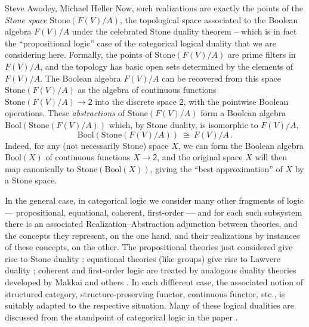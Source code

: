 \begin{artengenv2auth}{Steve Awodey, Michael Heller}
Now, such realizations are exactly the points of the \emph{Stone space} $\mathrm{Stone}(F(V)/A)$, the topological space associated to the Boolean algebra $F(V)/A$ under the celebrated Stone duality theorem \parencite{Johnstone} -- which is in fact the ``propositional logic'' case of the categorical logical duality that we are considering here.  Formally, the points of $\mathrm{Stone}(F(V)/A)$ are prime filters in $F(V)/A$, and the topology has basic open sets determined by the elements of $F(V)/A$.  The Boolean algebra $F(V)/A$ can be recovered from this space $\mathrm{Stone}(F(V)/A)$ as the algebra of continuous functions $\mathrm{Stone}(F(V)/A)\to \mathsf{2}$ into the discrete space $\mathsf{2}$, with the pointwise Boolean operations.  These \emph{abstractions} of $\mathrm{Stone}(F(V)/A)$ form a Boolean algebra $\mathrm{Bool}(\mathrm{Stone}(F(V)/A))$ which, by Stone duality, is isomorphic to $F(V)/A$,
\[
\mathrm{Bool}(\mathrm{Stone}(F(V)/A))\ \cong\ F(V)/A\,.
\]  
Indeed, for any (not necessarily Stone) space $X$, we can form the Boolean algebra $\mathrm{Bool}(X)$ of continuous functions $X \to \mathsf{2}$, and the original space $X$ will then map canonically to $\mathrm{Stone}(\mathrm{Bool}(X))$, giving the ``best approximation'' of $X$ by a Stone space.

In the general case, in categorical logic we consider many other fragments of logic --- propositional, equational, coherent, first-order --- and for each such subsystem there is an associated Realization--Abstraction adjunction between theories, and the concepts they represent, on the one hand, and their realizations by instances of these concepts, on the other.  The propositional theories just considered give rise to Stone duality \parencite{Johnstone}; equational theories (like groups) give rise to Lawvere duality \parencite{ALR}; coherent and first-order logic are treated by analogous duality theories developed by Makkai and others \parencites{Makkai}{AF}.  In each diffferent case, the associated notion of structured category, structure-preserving functor, continuous functor, etc., is suitably adapted to the respective situation.  Many of these logical dualities are discussed from the standpoint of categorical logic in the paper \parencite{Awodey2019}.




\end{artengenv2auth}

